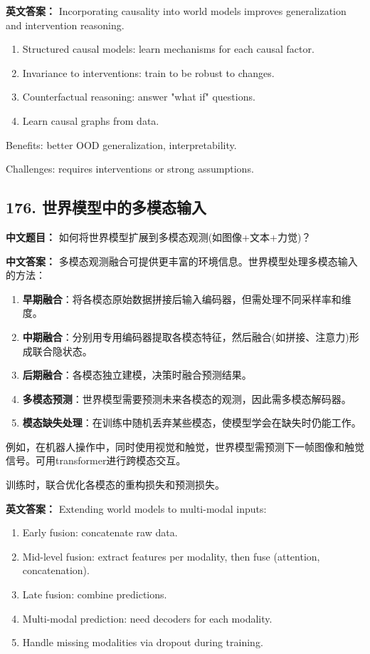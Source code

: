 \documentclass[10pt,a4paper]{ctexart}
\begin{document}
\textbf{英文答案：}  
Incorporating causality into world models improves generalization and intervention reasoning.

\begin{enumerate}
    \item Structured causal models: learn mechanisms for each causal factor.
    \item Invariance to interventions: train to be robust to changes.
    \item Counterfactual reasoning: answer "what if" questions.
    \item Learn causal graphs from data.
\end{enumerate}

Benefits: better OOD generalization, interpretability.

Challenges: requires interventions or strong assumptions.

\subsection*{176. 世界模型中的多模态输入}
\textbf{中文题目：} 如何将世界模型扩展到多模态观测(如图像+文本+力觉)？

\textbf{中文答案：}  
多模态观测融合可提供更丰富的环境信息。世界模型处理多模态输入的方法：

\begin{enumerate}
    \item \textbf{早期融合}：将各模态原始数据拼接后输入编码器，但需处理不同采样率和维度。
    \item \textbf{中期融合}：分别用专用编码器提取各模态特征，然后融合(如拼接、注意力)形成联合隐状态。
    \item \textbf{后期融合}：各模态独立建模，决策时融合预测结果。
    \item \textbf{多模态预测}：世界模型需要预测未来各模态的观测，因此需多模态解码器。
    \item \textbf{模态缺失处理}：在训练中随机丢弃某些模态，使模型学会在缺失时仍能工作。
\end{enumerate}

例如，在机器人操作中，同时使用视觉和触觉，世界模型需预测下一帧图像和触觉信号。可用transformer进行跨模态交互。

训练时，联合优化各模态的重构损失和预测损失。

\textbf{英文答案：}  
Extending world models to multi-modal inputs:

\begin{enumerate}
    \item Early fusion: concatenate raw data.
    \item Mid-level fusion: extract features per modality, then fuse (attention, concatenation).
    \item Late fusion: combine predictions.
    \item Multi-modal prediction: need decoders for each modality.
    \item Handle missing modalities via dropout during training.
\end{enumerate}
\end{document}
